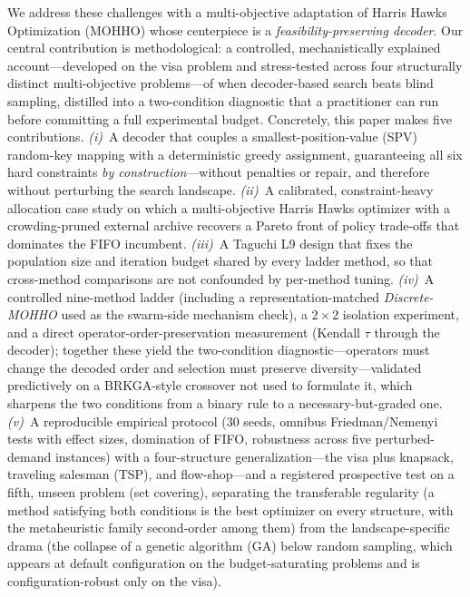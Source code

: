 \documentclass[runningheads]{llncs}
\begin{document}
We address these challenges with a multi-objective adaptation of Harris Hawks Optimization (MOHHO) whose centerpiece is a \emph{feasibility-preserving decoder}. Our central contribution is methodological: a controlled, mechanistically explained account---developed on the visa problem and stress-tested across four structurally distinct multi-objective problems---of when decoder-based search beats blind sampling, distilled into a two-condition diagnostic that a practitioner can run before committing a full experimental budget. Concretely, this paper makes five contributions. \emph{(i)}~A decoder that couples a smallest-position-value (SPV) random-key mapping with a deterministic greedy assignment, guaranteeing all six hard constraints \emph{by construction}---without penalties or repair, and therefore without perturbing the search landscape. \emph{(ii)}~A calibrated, constraint-heavy allocation case study on which a multi-objective Harris Hawks optimizer with a crowding-pruned external archive recovers a Pareto front of policy trade-offs that dominates the FIFO incumbent. \emph{(iii)}~A Taguchi L9 design that fixes the population size and iteration budget shared by every ladder method, so that cross-method comparisons are not confounded by per-method tuning. \emph{(iv)}~A controlled nine-method ladder (including a representation-matched \emph{Discrete-MOHHO} used as the swarm-side mechanism check), a $2\times2$ isolation experiment, and a direct operator-order-preservation measurement (Kendall $\tau$ through the decoder); together these yield the two-condition diagnostic---operators must change the decoded order and selection must preserve diversity---validated predictively on a BRKGA-style crossover not used to formulate it, which sharpens the two conditions from a binary rule to a necessary-but-graded one. \emph{(v)}~A reproducible empirical protocol (30 seeds, omnibus Friedman/Nemenyi tests with effect sizes, domination of FIFO, robustness across five perturbed-demand instances) with a four-structure generalization---the visa plus knapsack, traveling salesman (TSP), and flow-shop---and a registered prospective test on a fifth, unseen problem (set covering), separating the transferable regularity (a method satisfying both conditions is the best optimizer on every structure, with the metaheuristic family second-order among them) from the landscape-specific drama (the collapse of a genetic algorithm (GA) below random sampling, which appears at default configuration on the budget-saturating problems and is configuration-robust only on the visa).
\end{document}
